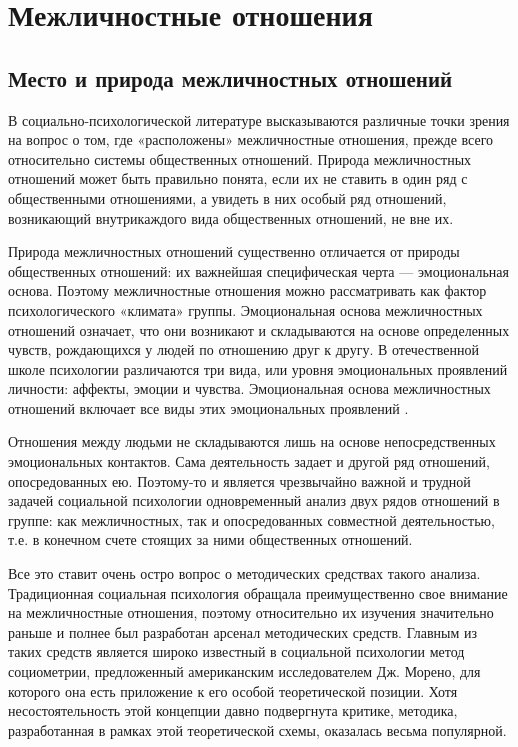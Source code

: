 \chapter{Межличностные отношения}
\section{Место и природа межличностных отношений}
В социально-психологической литературе высказываются различные точки зрения на вопрос о том, где «расположены» межличностные отношения, прежде всего относительно системы общественных отношений. Природа межличностных отношений может быть правильно понята, если их не ставить в один ряд с общественными отношениями, а увидеть в них особый ряд отношений, возникающий внутрикаждого вида общественных отношений, не вне их. 

Природа межличностных отношений существенно отличается от природы общественных отношений: их важнейшая специфическая черта — эмоциональная основа. Поэтому межличностные отношения можно рассматривать как фактор психологического «климата» группы. Эмоциональная основа межличностных отношений означает, что они возникают и складываются на основе определенных чувств, рождающихся у людей по отношению друг к другу. В отечественной школе психологии различаются три вида, или уровня эмоциональных проявлений личности: аффекты, эмоции и чувства. Эмоциональная основа межличностных отношений включает все виды этих эмоциональных проявлений \cite{4}. 

Отношения между людьми не складываются лишь на основе непосредственных эмоциональных контактов. Сама деятельность задает и другой ряд отношений, опосредованных ею. Поэтому-то и является чрезвычайно важной и трудной задачей социальной психологии одновременный анализ двух рядов отношений в группе: как межличностных, так и опосредованных совместной деятельностью, т.е. в конечном счете стоящих за ними общественных отношений.

Все это ставит очень остро вопрос о методических средствах такого анализа. Традиционная социальная психология обращала преимущественно свое внимание на межличностные отношения, поэтому относительно их изучения значительно раньше и полнее был разработан арсенал методических средств. Главным из таких средств является широко известный в социальной психологии метод социометрии, предложенный американским исследователем Дж. Морено, для которого она есть приложение к его особой теоретической позиции. Хотя несостоятельность этой концепции давно подвергнута критике, методика, разработанная в рамках этой теоретической схемы, оказалась весьма популярной.

